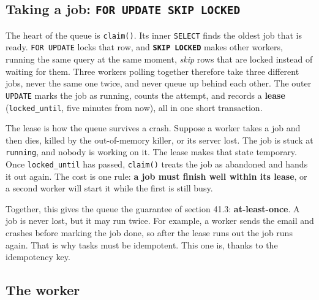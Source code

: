 \subsection*{\texorpdfstring{Taking a job: \texttt{FOR\ UPDATE\ SKIP\ LOCKED}}{Taking a job: FOR UPDATE SKIP LOCKED}}\label{41-event-driven-architecture:taking-a-job-for-update-skip-locked}

The heart of the queue is \texttt{claim()}. Its inner \texttt{SELECT} finds the oldest job that is ready. \texttt{FOR\ UPDATE} locks that row, and \textbf{\texttt{SKIP\ LOCKED}} makes other workers, running the same query at the same moment, \emph{skip} rows that are locked instead of waiting for them. Three workers polling together therefore take three different jobs, never the same one twice, and never queue up behind each other. The outer \texttt{UPDATE} marks the job as running, counts the attempt, and records a \textbf{lease} (\texttt{locked\_until}, five minutes from now), all in one short transaction.

The lease is how the queue survives a crash. Suppose a worker takes a job and then dies, killed by the out-of-memory killer, or its server lost. The job is stuck at \texttt{running}, and nobody is working on it. The lease makes that state temporary. Once \texttt{locked\_until} has passed, \texttt{claim()} treats the job as abandoned and hands it out again. The cost is one rule: \textbf{a job must finish well within its lease}, or a second worker will start it while the first is still busy.

Together, this gives the queue the guarantee of section 41.3: \textbf{at-least-once}. A job is never lost, but it may run twice. For example, a worker sends the email and crashes before marking the job done, so after the lease runs out the job runs again. That is why tasks must be idempotent. This one is, thanks to the idempotency key.

\subsection*{The worker}\label{41-event-driven-architecture:the-worker}

